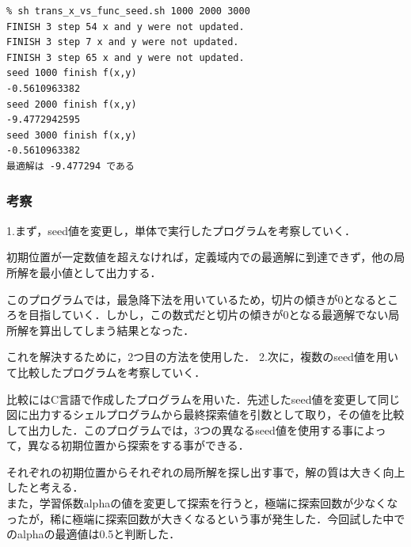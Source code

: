 \begin{breakbox}
\begin{verbatim}
% sh trans_x_vs_func_seed.sh 1000 2000 3000
FINISH 3 step 54 x and y were not updated.
FINISH 3 step 7 x and y were not updated.
FINISH 3 step 65 x and y were not updated.
seed 1000 finish f(x,y)
-0.5610963382
seed 2000 finish f(x,y)
-9.4772942595
seed 3000 finish f(x,y)
-0.5610963382
最適解は -9.477294 である
\end{verbatim}
\end{breakbox}


\subsubsection{考察}
1.まず，seed値を変更し，単体で実行したプログラムを考察していく．

初期位置が一定数値を超えなければ，定義域内での最適解に到達できず，他の局所解を最小値として出力する．

このプログラムでは，最急降下法を用いているため，切片の傾きが0となるところを目指していく．しかし，この数式だと切片の傾きが0となる最適解でない局所解を算出してしまう結果となった．

これを解決するために，2つ目の方法を使用した．
2.次に，複数のseed値を用いて比較したプログラムを考察していく．

比較にはC言語で作成したプログラムを用いた．先述したseed値を変更して同じ図に出力するシェルプログラムから最終探索値を引数として取り，その値を比較して出力した．このプログラムでは，3つの異なるseed値を使用する事によって，異なる初期位置から探索をする事ができる．

それぞれの初期位置からそれぞれの局所解を探し出す事で，解の質は大きく向上したと考える．\\

また，学習係数alphaの値を変更して探索を行うと，極端に探索回数が少なくなったが，稀に極端に探索回数が大きくなるという事が発生した．今回試した中でのalphaの最適値は0.5と判断した．
